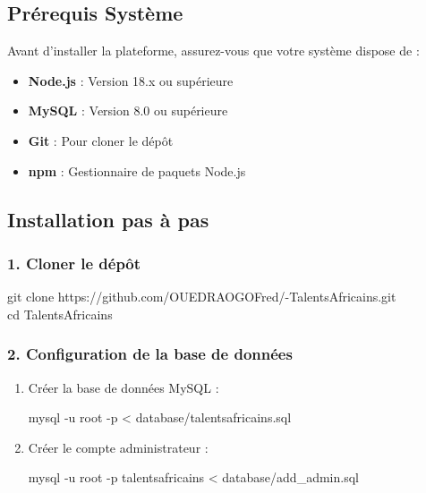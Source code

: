 \documentclass[12pt,a4paper]{article}
\begin{document}
\subsection{Prérequis Système}

Avant d'installer la plateforme, assurez-vous que votre système dispose de :

\begin{itemize}[leftmargin=*]
    \item \textbf{Node.js} : Version 18.x ou supérieure
    \item \textbf{MySQL} : Version 8.0 ou supérieure
    \item \textbf{Git} : Pour cloner le dépôt
    \item \textbf{npm} : Gestionnaire de paquets Node.js
\end{itemize}

\subsection{Installation pas à pas}

\subsubsection{1. Cloner le dépôt}

\begin{tcolorbox}[colback=darkcolor!5, colframe=darkcolor, fonttitle=\ttfamily]
git clone https://github.com/OUEDRAOGOFred/-TalentsAfricains.git\\
cd TalentsAfricains
\end{tcolorbox}

\subsubsection{2. Configuration de la base de données}

\begin{enumerate}[leftmargin=*]
    \item Créer la base de données MySQL :
    \begin{tcolorbox}[colback=darkcolor!5, colframe=darkcolor, fonttitle=\ttfamily]
    mysql -u root -p < database/talentsafricains.sql
    \end{tcolorbox}
    
    \item Créer le compte administrateur :
    \begin{tcolorbox}[colback=darkcolor!5, colframe=darkcolor, fonttitle=\ttfamily]
    mysql -u root -p talentsafricains < database/add\_admin.sql
    \end{tcolorbox}
\end{enumerate}
\end{document}
